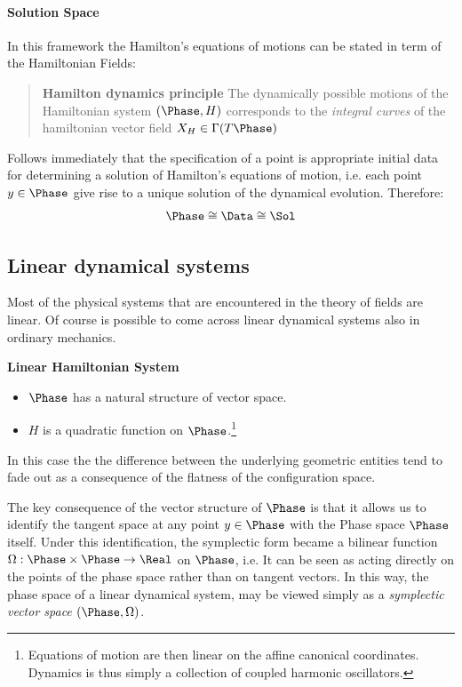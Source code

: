 \documentclass[Main]{subfiles}
\begin{document}
	\paragraph{Solution Space}
	In this framework the Hamilton's equations of motions can be stated in term of the Hamiltonian Fields:
				\begin{quotation}
				\textbf{Hamilton dynamics principle}
				The dynamically possible motions of the Hamiltonian system $(\Phase,H)$ corresponds to the \emph{ integral curves}\cite{Abraham1978} of the hamiltonian vector field $X_H \in \Gamma(T\Phase)$
			\end{quotation}
		Follows immediately that the specification of a point is appropriate initial data for determining a solution of Hamilton's equations of motion, i.e. each point $y\in \Phase$  give rise to a unique solution of the dynamical evolution.
		Therefore:
		\begin{displaymath}
			\Phase \cong \Data \cong \Sol
		\end{displaymath}
	
	\subsection{Linear dynamical systems}	
		
	Most of the physical systems that are encountered in the theory of fields are linear.	
	Of course is possible to come across linear dynamical systems also in ordinary mechanics. 
		\begin{remark}
			\textbf{Linear Hamiltonian System}
			\begin{itemize}
				\item $\Phase$ has a natural structure of vector space.
				\item	$H$ is a quadratic function on $\Phase$.\footnote{Equations of motion are then linear on the affine canonical coordinates. Dynamics is thus simply a collection of coupled harmonic oscillators.}
			\end{itemize}
		\end{remark}

	In this case the the difference between the underlying geometric entities tend to fade out as a consequence of the flatness of the configuration space.
	
	The key consequence of the vector structure of $\Phase$  is that it allows us to identify the tangent space at any point $y \in \Phase$ with the Phase space $\Phase$ itself.
	Under this identification, the symplectic form became a bilinear function $\Omega: \Phase \times \Phase \rightarrow \Real$ on $\Phase$, i.e. It can be seen as acting directly on the points of the phase space rather than on tangent vectors.
	In this way, the phase space of a linear dynamical system, may be viewed simply as a \emph{symplectic vector space} $(\Phase, \Omega)$.
	
\end{document}
